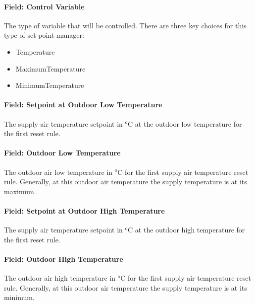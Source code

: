 \paragraph{Field: Control Variable}\label{field-control-variable-2}

The type of variable that will be controlled. There are three key choices for this type of set point manager:

\begin{itemize}
\item
  Temperature
\item
  MaximumTemperature
\item
  MinimumTemperature
\end{itemize}

\paragraph{Field: Setpoint at Outdoor Low Temperature}\label{field-setpoint-at-outdoor-low-temperature}

The supply air temperature setpoint in \(^{o}\)C at the outdoor low temperature for the first reset rule.

\paragraph{Field: Outdoor Low Temperature}\label{field-outdoor-low-temperature}

The outdoor air low temperature in \(^{o}\)C for the first supply air temperature reset rule. Generally, at this outdoor air temperature the supply temperature is at its maximum.

\paragraph{Field: Setpoint at Outdoor High Temperature}\label{field-setpoint-at-outdoor-high-temperature}

The supply air temperature setpoint in \(^{o}\)C at the outdoor high temperature for the first reset rule.

\paragraph{Field: Outdoor High Temperature}\label{field-outdoor-high-temperature}

The outdoor air high temperature in \(^{o}\)C for the first supply air temperature reset rule. Generally, at this outdoor air temperature the supply temperature is at its minimum.

